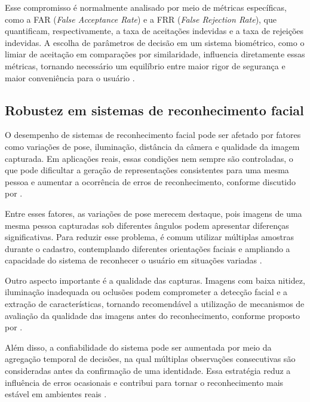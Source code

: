 Esse compromisso é normalmente analisado por meio de métricas específicas, como a \acs{FAR} (\textit{False Acceptance Rate}) e a \acs{FRR} (\textit{False Rejection Rate}), que quantificam, respectivamente, a taxa de aceitações indevidas e a taxa de rejeições indevidas. A escolha de parâmetros de decisão em um sistema biométrico, como o limiar de aceitação em comparações por similaridade, influencia diretamente essas métricas, tornando necessário um equilíbrio entre maior rigor de segurança e maior conveniência para o usuário \cite{jain2004biometric}.

\subsection{Robustez em sistemas de reconhecimento facial}

O desempenho de sistemas de reconhecimento facial pode ser afetado por fatores como variações de pose, iluminação, distância da câmera e qualidade da imagem capturada. Em aplicações reais, essas condições nem sempre são controladas, o que pode dificultar a geração de representações consistentes para uma mesma pessoa e aumentar a ocorrência de erros de reconhecimento, conforme discutido por \textcite{zhao2003face}.

Entre esses fatores, as variações de pose merecem destaque, pois imagens de uma mesma pessoa capturadas sob diferentes ângulos podem apresentar diferenças significativas. Para reduzir esse problema, é comum utilizar múltiplas amostras durante o cadastro, contemplando diferentes orientações faciais e ampliando a capacidade do sistema de reconhecer o usuário em situações variadas \cite{hassaballah2015face}.

Outro aspecto importante é a qualidade das capturas. Imagens com baixa nitidez, iluminação inadequada ou oclusões podem comprometer a detecção facial e a extração de características, tornando recomendável a utilização de mecanismos de avaliação da qualidade das imagens antes do reconhecimento, conforme proposto por \textcite{schlett2022facequality}.

Além disso, a confiabilidade do sistema pode ser aumentada por meio da agregação temporal de decisões, na qual múltiplas observações consecutivas são consideradas antes da confirmação de uma identidade. Essa estratégia reduz a influência de erros ocasionais e contribui para tornar o reconhecimento mais estável em ambientes reais \cite{meng2019fan}.


